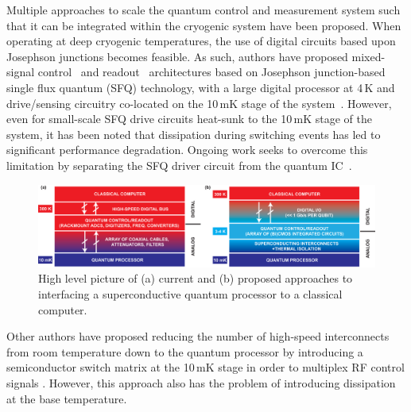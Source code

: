 \documentclass[journal]{IEEEtran}
\newcommand{\CR}[1]{{\color{black}#1}}
\begin{document}
Multiple approaches  to  scale  the quantum control and measurement system such that it can be integrated within the cryogenic system have been proposed. When operating at deep cryogenic temperatures, the use of \CR{digital} circuits based upon Josephson junctions becomes feasible. As such, authors have proposed mixed-signal control~\cite{leonard2019digital} and readout~\cite{opremcak2018measurement} architectures based on Josephson junction\CR{-based single flux quantum (SFQ)} technology, with a large digital processor at 4\,K and drive/sensing circuitry co-located on the 10\,mK stage of the system~\cite{mcdermott2018quantum}. However, \CR{even for small-scale SFQ drive circuits heat-sunk to the 10\,mK stage of the system, it has been noted that dissipation during switching events has led to significant performance degradation. }%
Ongoing work seeks to overcome this limitation \CR{by separating the SFQ driver circuit from the quantum IC~\cite{dodge2019superconducting}}.
\begin{figure}[bt!]
\centering
\includegraphics[width=2\columnwidth]{Figures/Figure_1}
\caption{High level picture of (a) current and (b) proposed approaches to interfacing a \CR{superconductive} quantum processor to a classical computer. }\label{nowfuture}
\end{figure}

Other authors have proposed reducing the number of high-speed interconnects from room temperature down to the quantum processor by introducing a semiconductor switch matrix at the 10\,mK stage in order to multiplex RF control signals \cite{hornibrook2015cryogenic}. However, this approach also has the problem of introducing dissipation at the base temperature.  
\end{document}
